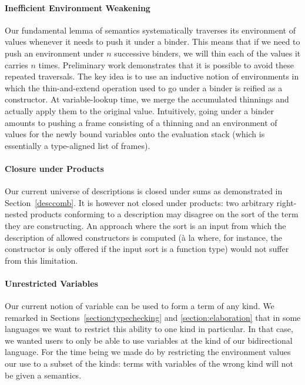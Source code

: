\paragraph{Inefficient Environment Weakening} Our fundamental lemma of
semantics systematically traverses its environment of values whenever it
needs to push it under a binder. This means that if we need to push an
environment under $n$ successive binders, we will thin each of the values
it carries $n$ times.
%
Preliminary work demonstrates that it is possible to avoid these repeated
traversals. The key idea is to use an inductive notion of environments in
which the thin-and-extend operation used to go under a binder is reified
as a constructor. At variable-lookup time, we merge the accumulated
thinnings and actually apply them to the original value.
%
Intuitively, going under a binder amounts to pushing a frame consisting of
a thinning and an environment of values for the newly bound variables onto
the evaluation stack (which is essentially a type-aligned list of frames).


\paragraph{Closure under Products} Our current universe of descriptions is
closed under sums as demonstrated in Section~\ref{desccomb}. It is however
not closed under products: two arbitrary right-nested products conforming
to a description may disagree on the sort of the term they are constructing.
An approach where the sort is an input from which the description of allowed
constructors is computed (à la \cite{DBLP:phd/ethos/Dagand13} where,
for instance, the  constructor is only offered if the input sort is
a function type) would not suffer from this limitation.

\paragraph{Unrestricted Variables} Our current notion of variable can be used
to form a term of any kind. We remarked in Sections~\ref{section:typechecking}
and \ref{section:elaboration} that in some languages we want to restrict this
ability to one kind in particular. In that case, we wanted users to only be able
to use variables at the kind  of our bidirectional language. For the
time being we made do by restricting the environment values our 
use to a subset of the kinds: terms with variables of the wrong kind will not be
given a semantics.

